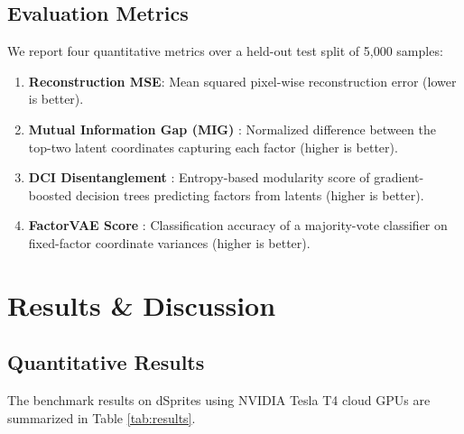 \documentclass[11pt,a4paper]{article}
\begin{document}
\subsection{Evaluation Metrics}
We report four quantitative metrics over a held-out test split of 5,000 samples:
\begin{enumerate}
    \item \textbf{Reconstruction MSE}: Mean squared pixel-wise reconstruction error (lower is better).
    \item \textbf{Mutual Information Gap (MIG)} \cite{chen2018isolating}: Normalized difference between the top-two latent coordinates capturing each factor (higher is better).
    \item \textbf{DCI Disentanglement} \cite{eastwood2018framework, locatello2019challenging}: Entropy-based modularity score of gradient-boosted decision trees predicting factors from latents (higher is better).
    \item \textbf{FactorVAE Score} \cite{kim2018disentangling}: Classification accuracy of a majority-vote classifier on fixed-factor coordinate variances (higher is better).
\end{enumerate}

\section{Results \& Discussion}

\subsection{Quantitative Results}
The benchmark results on dSprites using NVIDIA Tesla T4 cloud GPUs are summarized in Table \ref{tab:results}.

\begin{table}[!htbp]
\centering
\caption{\textbf{Quantitative Benchmark Results on dSprites ($d=10$, 5,000 Evaluation Samples)}}
\label{tab:results}
\vspace{0.3em}
\end{table}
\end{document}
